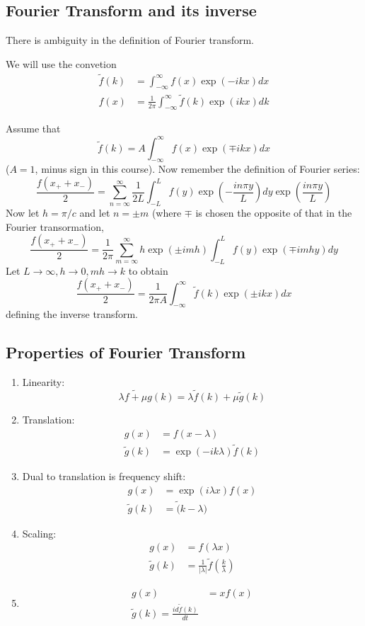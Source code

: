 \documentclass[a4paper]{article}
\newcommand*{\ft}{\tilde}
\begin{document}
\subsection{Fourier Transform and its inverse}

There is ambiguity in the definition of Fourier transform.

\begin{convention}
  We will use the convetion
  \begin{align*}
    \ft f(k) &= \int_{-\infty}^{\infty} f(x) \exp(-ikx) dx \\
    f(x) &= \frac{1}{2\pi} \int_{-\infty}^{\infty} \ft f(k) \exp(ikx) dk
  \end{align*}
\end{convention}

Assume that
\[
  \ft f(k) = A \int_{-\infty}^{\infty} f(x) \exp(\mp ikx) dx
\]
(\(A = 1\), minus sign in this course). Now remember the definition of Fourier series:
\[
  \frac{f(x_+ + x_-)}{2} = \sum_{n = \infty}^{\infty} \frac{1}{2L} \int_{-L}^{L} f(y) \exp \left( -\frac{in\pi y}{L} \right) dy \exp \left( \frac{in\pi y}{L} \right)
\]
Now let \(h = \pi/c\) and let \(n = \pm m\) (where \(\mp\) is chosen the opposite of that in the Fourier transormation,
\[
  \frac{f(x_+ + x_-)}{2} = \frac{1}{2\pi} \sum_{m = \infty}^{\infty} h \exp (\pm imh) \int_{-L}^{L} f(y) \exp(\mp imhy) dy
\]
Let \(L \to \infty, h \to 0, mh \to k\) to obtain
\[
  \frac{f(x_+ + x_-)}{2} = \frac{1}{2\pi A} \int_{-\infty}^{\infty} \ft f(k) \exp(\pm ikx) dx
\]
defining the inverse transform.

\subsection{Properties of Fourier Transform}

\begin{enumerate}
\item Linearity:
  \[
    \ft{\lambda f + \mu g} (k) = \lambda \ft f(k) + \mu \ft g(k)
  \]
\item Translation:
  \begin{align*}
    g(x) &= f(x - \lambda) \\
    \ft g(k) &= \exp(-ik\lambda) \ft f(k)
  \end{align*}
\item Dual to translation is frequency shift:
  \begin{align*}
    g(x) &= \exp(i\lambda x) f(x) \\
    \ft g(k) &= \ft(k - \lambda)
  \end{align*}
\item Scaling:
  \begin{align*}
    g(x) &= f(\lambda x) \\
    \ft g(k) &= \frac{1}{|\lambda|} \ft f \left( \frac{k}{\lambda} \right)
  \end{align*}
\item
  \begin{align*}
    g(x) &= x f(x) \\
    \ft g(k) = \frac{i d \ft f(k)}{dt}
  \end{align*}
\end{enumerate}
\end{document}
